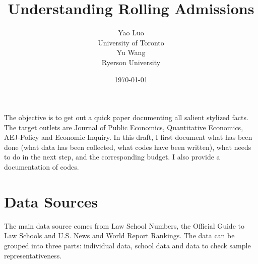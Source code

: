 \documentclass[12pt]{article}
\begin{document}
\title{Understanding Rolling Admissions} 
  
 \author{ Yao Luo\\ 
University of Toronto\\ 
$$ \\
Yu Wang\\
Ryerson University}

\date{\today}
\maketitle

The objective is to get out a quick paper documenting all salient stylized facts. The target outlets are Journal of Public Economics, Quantitative Economics, AEJ-Policy and Economic Inquiry. In this draft, I first document what has been done (what data has been collected, what codes have been written), what needs to do in the next step, and the corresponding budget. I also provide a documentation of codes. 

\section{Data Sources}
The main data source comes from Law School Numbers, the Official Guide to Law Schools and U.S. News and World Report Rankings. The data can be grouped into three parts: individual data, school data and data to check sample representativeness.
\end{document}
